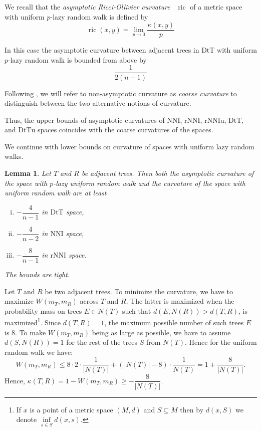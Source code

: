 \documentclass{amsart}
\newtheorem{lemma}{Lemma}
\theoremstyle{definition}
\newcommand{\nni}{\mathrm{NNI}}
\newcommand{\rnni}{\mathrm{rNNI}}
\newcommand{\rnniu}{\mathrm{rNNIu}}
\newcommand{\mdts}{\mathrm{DtT}}
\newcommand{\mdtsu}{\mathrm{DtTu}}
\newcommand{\ric}{\operatorname{ric}}
\begin{document}
We recall that the {\em asymptotic Ricci-Ollivier curvature}~\autocite{Loisel2014-gu} $\ric$ of a metric space with uniform $p$-lazy random walk is defined by
\[
\ric(x,y) = \lim_{p\to0} \frac{\kappa(x,y)}{p}
\]

In this case the asymptotic curvature between adjacent trees in $\mdts$ with uniform $p$-lazy random walk is bounded from above by
\[
\frac{1}{2(n-1)}
\]

Following \textcite{Loisel2014-gu}, we will refer to non-asymptotic curvature as {\em coarse curvature} to distinguish between the two alternative notions of curvature.


Thus, the upper bounds of asymptotic curvatures of $\nni$, $\rnni$, $\rnniu$, $\mdts$, and $\mdtsu$ spaces coincides with the coarse curvatures of the spaces.

We continue with lower bounds on curvature of spaces with uniform lazy random walks.

\begin{lemma}\label{uniformLower}
Let $T$ and $R$ be adjacent trees.
Then both the asymptotic curvature of the space with $p$-lazy uniform random walk and the curvature of the space with uniform random walk are at least
\begin{enumerate}[(i)]
\item $-\dfrac{4}{n-1}$ in $\mdts$ space,
\item $-\dfrac{4}{n-2}$ in $\nni$ space,
\item $-\dfrac{8}{n-1}$ in $\rnni$ space.
\end{enumerate}

The bounds are tight.
\end{lemma}

\proof
Let $T$ and $R$ be two adjacent trees.
To minimize the curvature, we have to maximize $W(m_T, m_R)$ across $T$ and $R$.
The latter is maximized when the probability mass on trees $E\in N(T)$ such that $d(E, N(R)) > d(T, R)$, is
maximized\footnote{If $x$ is a point of a metric space $(M,d)$ and $S \subseteq M$ then by $d(x,S)$ we denote $\inf\limits_{s \in S} d(x,s)$.}.
Since $d(T, R) = 1$, the maximum possible number of such trees $E$ is
$8$.
To make $W(m_T,m_R)$ being as large as possible, we have to assume $d(S, N(R)) = 1$ for the rest of the trees $S$ from $N(T)$.
Hence for the uniform random walk we have:
\[
W(m_T,m_R)\leq 8 \cdot 2 \cdot \frac{1}{|N(T)|} +
(|N(T)| - 8) \cdot \frac{1}{N(T)} = 1 + \dfrac{8}{|N(T)|}.
\]
Hence, $\kappa(T,R) = 1 - W(m_T,m_R) \geq - \dfrac{8}{|N(T)|}$.
\end{document}
